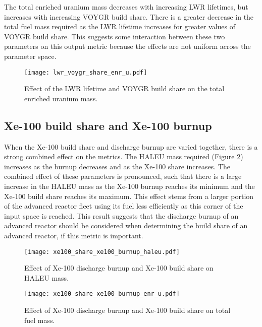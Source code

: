 The total enriched uranium mass decreases with increasing \gls{LWR} 
lifetimes, but increases with increasing VOYGR build share. There is a 
greater decrease in the total fuel mass required as the \gls{LWR} 
lifetime increases for greater values of VOYGR build share. This 
suggests some interaction between these two parameters on this 
output metric because the effects are not uniform across the parameter 
space. 

\begin{figure}[h!]
    \centering
    \texttt{[image: lwr\_voygr\_share\_enr\_u.pdf]}
    \caption{Effect of the LWR lifetime and VOYGR build share on 
    the total enriched uranium mass.}
    \label{fig:lwr_voygr_share_enr_u}
\end{figure}

\subsection{Xe-100 build share and Xe-100 burnup}
When the Xe-100 build share and discharge burnup are varied together,
there is a strong combined effect on the metrics. The \gls{HALEU} 
mass required (Figure \ref{fig:xe100_share_xe100_burnup_haleu}) 
increases as the burnup decreases and as the Xe-100 share increases.
The combined effect of these parameters is pronounced, such that there 
is a large increase in the \gls{HALEU} mass as the Xe-100 burnup 
reaches its minimum and the Xe-100 build share reaches its maximum. This 
effect stems from a larger portion of the advanced reactor fleet 
using its fuel less efficiently as this corner of the input space is 
reached. This result suggests that the discharge burnup of an advanced 
reactor should be considered when determining the build share of an
advanced reactor, if this metric is important. 

\begin{figure}[h!]
    \centering
    \texttt{[image: xe100\_share\_xe100\_burnup\_haleu.pdf]}
    \caption{Effect of Xe-100 discharge burnup and Xe-100 build share 
    on HALEU mass.}
    \label{fig:xe100_share_xe100_burnup_haleu}
\end{figure}


\begin{figure}[h!]
    \centering
    \texttt{[image: xe100\_share\_xe100\_burnup\_enr\_u.pdf]}
    \caption{Effect of Xe-100 discharge burnup and Xe-100 build share 
    on total fuel mass.}
    \label{fig:xe100_share_xe100_burnup_enr_u}
\end{figure}

